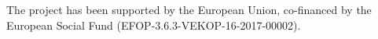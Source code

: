 
		
	The project has been supported by the European Union,
	co-financed by the European Social Fund (EFOP-3.6.3-VEKOP-16-2017-00002).
		
